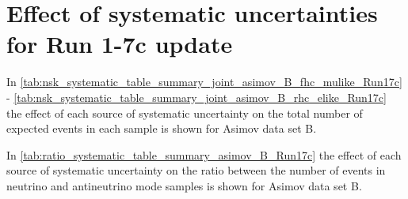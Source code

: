 
%
%

\section{Effect of systematic uncertainties for Run 1-7c update}
\label{app:systematics_run17c}


In \cref{tab:nsk_systematic_table_summary_joint_asimov_B_fhc_mulike_Run17c} - 
\ref{tab:nsk_systematic_table_summary_joint_asimov_B_rhc_elike_Run17c}
the effect of each source of systematic uncertainty on the total number of expected events in each sample is shown
for Asimov data set B.

In \cref{tab:ratio_systematic_table_summary_asimov_B_Run17c} 
the effect of each source of systematic uncertainty on the ratio between the number of events in 
neutrino and antineutrino mode samples is shown for Asimov data set B.





\clearpage





